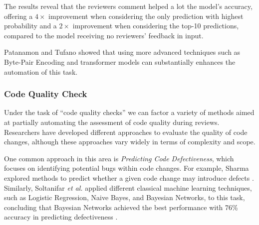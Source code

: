 
The results reveal that the reviewers comment helped a lot the model's
accuracy, offering a $4\times$ improvement when considering the only prediction
with highest probability and a $2\times$ improvement when considering the
top-10 predictions, compared to the model receiving no reviewers' feedback in
input.


Patanamon \etal \cite{patanamon:icse2022} and Tufano \etal
\cite{tufano:icse2022} showed that using more advanced techniques such as
Byte-Pair Encoding and transformer models can substantially enhances the
automation of this task.


\subsubsection{Code Quality Check}

Under the task of ``code quality checks'' we can factor a variety of methods
aimed at partially automating the assessment of code quality during reviews.
Researchers have developed different approaches to evaluate the quality of code
changes, although these approaches vary widely in terms of complexity and
scope.

One common approach in this area is \textit{Predicting Code Defectiveness},
which focuses on identifying potential bugs within code changes. For example,
Sharma \etal explored methods to predict whether a given code change may
introduce defects \cite{sharma:spe2019}. Similarly, Soltanifar \textit{et al.}
applied different classical machine learning techniques, such as Logistic
Regression, Naive Bayes, and Bayesian Networks, to this task, concluding that
Bayesian Networks achieved the best performance with 76\% accuracy in
predicting defectiveness \cite{soltanifar:esem2016}.

